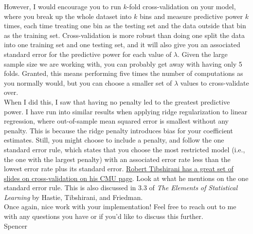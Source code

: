 \documentclass[11pt]{article}
\begin{document}
However, I would encourage you to run $k$-fold cross-validation on your model, where you break up the whole dataset into $k$ bins and measure predictive power $k$ times, each time treating one bin as the testing set and the data outside that bin as the training set. Cross-validation is more robust than doing one split the data into one training set and one testing set, and it will also give you an associated standard error for the predictive power for each value of $\lambda$. Given the large sample size we are working with, you can probably get away with having only 5 folds. Granted, this means performing five times the number of computations as you normally would, but you can choose a smaller set of $\lambda$ values to cross-validate over. \\

When I did this, I saw that having no penalty led to the greatest predictive power. I have run into similar results when applying ridge regularization to linear regression, where out-of-sample mean squared error is smallest without any penalty. This is because the ridge penalty introduces bias for your coefficient estimates. Still, you might choose to include a penalty, and follow the one standard error rule, which states that you choose the most restricted model (i.e., the one with the largest penalty) with an associated error rate less than the lowest error rate plus its standard error. \href{http://www.stat.cmu.edu/~ryantibs/datamining/lectures/19-val2.pdf}{Robert Tibshirani has a great set of slides on cross-validation on his CMU page}. Look at what he mentions on the one standard error rule. This is also discussed in 3.3 of \emph{The Elements of Statistical Learning} by Hastie, Tibshirani, and Friedman.\\

Once again, nice work with your implementation! Feel free to reach out to me with any questions you  have or if you'd like to discuss this further. \\

Spencer
\end{document}
